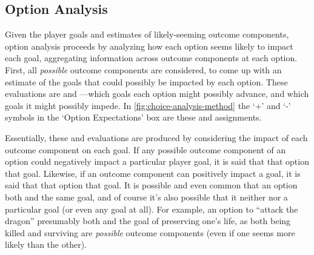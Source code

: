 \subsection{Option Analysis}

\label{sec:cp-option-analysis}

Given the player goals and estimates of likely-seeming outcome components, option analysis proceeds by analyzing how each option seems likely to impact each goal, aggregating information across outcome components at each option.
%
First, all \emph{possible} outcome components are considered, to come up with an estimate of the goals that could possibly be impacted by each option.
%
These evaluations are  and ---which goals each option might possibly advance, and which goals it might possibly impede.
%
In \cref{fig:choice-analysis-method} the `+' and `-' symbols in the `Option Expectations' box are these  and  assignments.


Essentially, these  and  evaluations are produced by considering the impact of each outcome component on each goal.
%
If any possible outcome component of an option could negatively impact a particular player goal, it is said that that option  that goal.
%
Likewise, if an outcome component can positively impact a goal, it is said that that option  that goal.
%
It is possible and even common that an option both  and  the same goal, and of course it's also possible that it neither  nor  a particular goal (or even any goal at all).
%
For example, an option to ``attack the dragon'' presumably both  and  the goal of preserving one's life, as both being killed and surviving are \emph{possible} outcome components (even if one seems more likely than the other).


